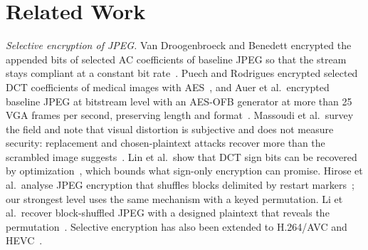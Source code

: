 \documentclass{ieeeaccess}
\newif\ifextended
\begin{document}
\section{Related Work}
\textit{Selective encryption of JPEG.} Van Droogenbroeck and Benedett encrypted the appended bits of selected AC coefficients of baseline JPEG\ifextended, leaving the Huffman code words in place,\fi{} so that the stream stays compliant at a constant bit rate~\cite{vandroogenbroeck2002}. Puech and Rodrigues encrypted selected DCT coefficients of medical images with AES\ifextended{} in OFB mode\fi~\cite{puech2005}, and Auer et al.\ encrypted baseline JPEG at bitstream level\ifextended, permuting Huffman code-word/value pairs and toggling value bits\fi{} with an AES-OFB generator at more than 25 VGA frames per second, preserving length and format~\cite{auer2013}. Massoudi et al.\ survey the field and note that visual distortion is subjective and does not measure security: replacement and chosen-plaintext attacks recover more than the scrambled image suggests~\cite{massoudi2008}. Lin et al.\ show that DCT sign bits can be recovered by optimization~\cite{lin2024}, which bounds what sign-only encryption can promise. Hirose et al.\ analyse JPEG encryption that shuffles blocks delimited by restart markers~\cite{hirose2024}; our strongest level uses the same mechanism with a keyed permutation. Li et al.\ recover block-shuffled JPEG with a designed plaintext that reveals the permutation\ifextended{} through its per-block non-zero counts, which then inverts any image shuffled with the same permutation\fi~\cite{li2025shuffle}.\ifextended{} Learned attackers are a threat beyond hand-made ones: Sirichotedumrong and Kiya find that a GAN-based ciphertext-only attack recovers visual content from most image-protection schemes designed for privacy-preserving deep learning~\cite{sirichotedumrong2020}, which is why we test trained attackers in Section~\ref{sec:security}.\fi{} Selective encryption has also been extended to H.264/AVC and HEVC~\cite{boyadjis2017}.
\end{document}
